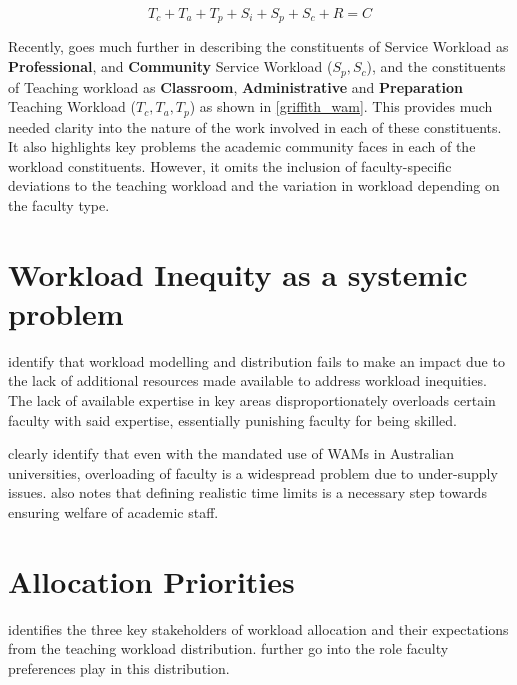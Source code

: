 \begin{enumerate}
\begin{equation}
    T_c + T_a + T_p + S_i + S_p + S_c+R = C
    \label{griffith_wam}
\end{equation}

Recently, \parencite{griffith2020framework} goes much further in describing the constituents of Service Workload as \textbf{Professional}, and \textbf{Community} Service Workload (\(S_p, S_c\)), and the constituents of Teaching workload as \textbf{Classroom}, \textbf{Administrative} and \textbf{Preparation} Teaching Workload (\(T_c, T_a, T_p\)) as shown in \autoref{griffith_wam}. This provides much needed clarity into the nature of the work involved in each of these constituents. It also highlights key problems the academic community faces in each of the workload constituents. However, it omits the inclusion of faculty-specific deviations to the teaching workload and the variation in workload depending on the faculty type.

\end{enumerate}

\section{Workload Inequity as a systemic problem}
\parencite{jensen2009overload, kenny2014effectiveness} identify that workload modelling and distribution fails to make an impact due to the lack of additional resources made available to address workload inequities. The lack of available expertise in key areas disproportionately overloads certain faculty with said expertise, essentially punishing faculty for being skilled.

\parencite{vardi2009impacts, houston2006academic} clearly identify that even with the mandated use of WAMs in Australian universities, overloading of faculty is a widespread problem due to under-supply issues.\parencite{kenny2014effectiveness} also notes that defining realistic time limits is a necessary step towards ensuring welfare of academic staff.

\section{Allocation Priorities}

\parencite{harwood1975optimizing} identifies the three key stakeholders of workload allocation and their expectations from the teaching workload distribution. \parencite{schniederjans1987goal, badri1998multi} further go into the role faculty preferences play in this distribution.

